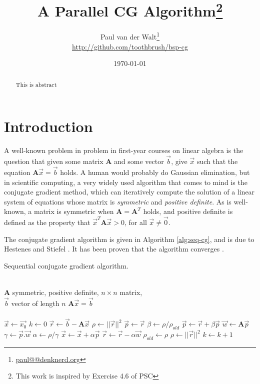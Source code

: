 \documentclass[a4paper]{article}
\author{Paul van der Walt\footnote{\url{paul@@denknerd.org}}\\ \url{http://github.com/toothbrush/bsp-cg}}
\date{\today}
\title{A Parallel CG Algorithm\footnote{This work is inspired by Exercise 4.6 of PSC\cite{bisseling2004parallel}}}
\begin{document}
\maketitle

\begin{abstract}
    This is abstract
\end{abstract}

\newcommand{\ve}[1]{\ensuremath{\vec{#1}}}
\newcommand{\mat}[1]{\ensuremath{\boldsymbol{#1}}}
\newcommand{\plotsize}{0.7\textwidth}
\section{Introduction}

A well-known problem in problem in first-year courses on linear algebra is the question that
given some matrix \mat{A} and some vector \ve{b}, give \ve{x} such that the equation $\mat A \ve x = \ve b$ holds. A human would probably do Gaussian elimination, but
in scientific computing, a very widely used algorithm that comes to mind is the conjugate gradient method, which can iteratively compute the solution of a linear system of equations whose matrix is \emph{symmetric} and \emph{positive definite}.
As is well-known, a matrix is symmetric when $\mat A = \mat A^T$ holds, and positive definite is defined as the property that $\ve x^T \mat A \ve x > 0$, for all $\ve x \neq \ve 0$.

The conjugate gradient algorithm is given in Algorithm \ref{alg:seq-cg}, and is due to Hestenes and Stiefel \cite{hestenes1952methods}. It has been proven that the algorithm converges \cite{golub1996matrix}.

\begin{algorithm}
    \caption{Sequential conjugate gradient algorithm.}
\label{alg:seq-cg}
\begin{algorithmic}
    \REQUIRE ~\\
             $\mat A$ symmetric, positive definite, $n\times n$ matrix,\\
             $\ve  b$ vector of length $n$
    \ENSURE  $\mat A \ve x = \ve b$\\~\\
    \STATE $\ve x \leftarrow \ve{x_0}$ 
    \STATE $k \leftarrow 0$ 
    \STATE $\ve r \leftarrow \ve b - \mat A \ve x$
    \STATE $\rho \leftarrow ||\ve r||^2$
    \WHILE{$\sqrt{\rho} > \epsilon ||\ve b|| \wedge k < k_{max}$}
            \STATE $\ve p \leftarrow \ve r$
        \ELSE
            \STATE $\beta \leftarrow \rho/\rho_{old}$
            \STATE $\ve p \leftarrow \ve r + \beta \ve p$
        \ENDIF
        \STATE $\vec w \leftarrow \mat A \ve p$
        \STATE $\gamma \leftarrow \ve p . \ve w$
        \STATE $\alpha \leftarrow \rho/\gamma$
        \STATE $\ve x  \leftarrow \ve x + \alpha \ve p$
        \STATE $\ve r  \leftarrow \ve r - \alpha \ve w$
        \STATE $\rho_{old} \leftarrow \rho$
        \STATE $\rho   \leftarrow || \ve r || ^2$
        \STATE $k \leftarrow k+1$
    \ENDWHILE
\end{algorithmic}
\end{algorithm}
\end{document}
